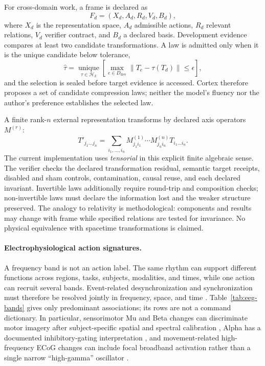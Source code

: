 \documentclass[10pt,twocolumn]{article}
\theoremstyle{definition}
\theoremstyle{plain}
\theoremstyle{remark}
\begin{document}
For cross-domain work, a frame is declared as
\begin{equation}
F_d=(X_d,A_d,R_d,V_d,B_d),
\label{eq:cognitive-frame}
\end{equation}
where $X_d$ is the representation space, $A_d$ admissible actions, $R_d$ relevant relations, $V_d$ verifier contract, and $B_d$ a declared basis.  Development evidence compares at least two candidate transformations.  A law is admitted only when it is the unique candidate below tolerance,
\begin{equation}
\widehat{\tau}=\operatorname*{unique}_{\tau\in\mathcal{H}_k}
\left[\max_{e\in D_{\mathrm{dev}}}\lVert T_e-\tau(T_d)\rVert\leq\epsilon\right],
\label{eq:law-induction}
\end{equation}
and the selection is sealed before target evidence is accessed.  Cortex therefore proposes a set of candidate compression laws; neither the model's fluency nor the author's preference establishes the selected law.

A finite rank-$n$ external representation transforms by declared axis operators $M^{(r)}$:
\begin{equation}
T'_{j_1\ldots j_n}=\sum_{i_1,\ldots,i_n}
M^{(1)}_{j_1i_1}\cdots M^{(n)}_{j_ni_n}T_{i_1\ldots i_n}.
\label{eq:tensor-transform}
\end{equation}
The current implementation uses \emph{tensorial} in this explicit finite algebraic sense.  The verifier checks the declared transformation residual, semantic target receipts, disabled and sham controls, contamination, causal reuse, and each declared invariant.  Invertible laws additionally require round-trip and composition checks; non-invertible laws must declare the information lost and the weaker structure preserved.  The analogy to relativity is methodological: components and results may change with frame while specified relations are tested for invariance.  No physical equivalence with spacetime transformations is claimed.

\paragraph{Electrophysiological action signatures.}
A frequency band is not an action label.  The same rhythm can support different functions across regions, tasks, subjects, modalities, and times, while one action can recruit several bands.  Event-related desynchronization and synchronization must therefore be resolved jointly in frequency, space, and time \citep{pfurtscheller1999erd}.  Table~\ref{tab:eeg-bands} gives only predominant associations; its rows are not a command dictionary.  In particular, sensorimotor Mu and Beta changes can discriminate motor imagery after subject-specific spatial and spectral calibration \citep{pfurtscheller1997imagery}, Alpha has a documented inhibitory-gating interpretation \citep{jensen2010alpha}, and movement-related high-frequency ECoG changes can include focal broadband activation rather than a single narrow ``high-gamma'' oscillator \citep{miller2007spectral}.
\end{document}
